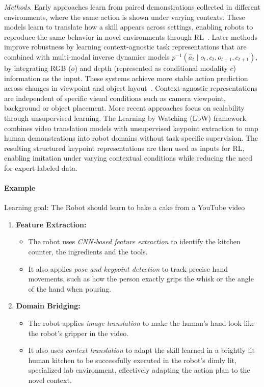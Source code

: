     \textit{Methods.} Early approaches learn from paired demonstrations collected in different environments, where the same action is shown under varying contexts. These models learn to translate how a skill appears across settings, enabling robots to reproduce the same behavior in novel environments through \ac{RL}~\cite{Liu2017ImitationFO}. Later methods improve robustness by learning context-agnostic task representations that are combined with multi-modal inverse dynamics models $p^{-1}(\hat{a}_t \mid o_t, c_t, o_{t+1}, c_{t+1})$, by integrating RGB ($o$) and depth (represented as conditional modality $c$) information as the input. These systems achieve more stable action prediction across changes in viewpoint and object layout~\cite{Yang2020CrosscontextVI}. Context-agnostic representations are independent of specific visual conditions such as camera viewpoint, background or object placement.
    More recent approaches focus on scalability through unsupervised learning. The Learning by Watching (LbW) framework~\cite{Xiong2021LearningBW} combines video translation models with unsupervised keypoint extraction to map human demonstrations into robot domains without task-specific supervision. The resulting structured keypoint representations are then used as inputs for \ac{RL}, enabling imitation under varying contextual conditions while reducing the need for expert-labeled data.




\paragraph{Example}
Learning goal: The Robot should learn to bake a cake from a YouTube video
\begin{enumerate}
    \item \textbf{Feature Extraction:} 
    \begin{itemize}
        \item The robot uses \textit{\acs{CNN}-based feature extraction} to identify the kitchen counter, the ingredients and the tools.
        \item It also applies \textit{pose and keypoint detection} to track precise hand movements, such as how the person exactly grips the whisk or the angle of the hand when pouring.
    \end{itemize}


    \item \textbf{Domain Bridging:} 
    \begin{itemize} 
        \item The robot applies \textit{image translation} to make the human's hand look like the robot's gripper in the video.
        \item It also uses \textit{context translation} to adapt the skill learned in a brightly lit human kitchen to be successfully executed in the robot's dimly lit, specialized lab environment, effectively adapting the action plan to the novel context.
    \end{itemize} 
\end{enumerate}


